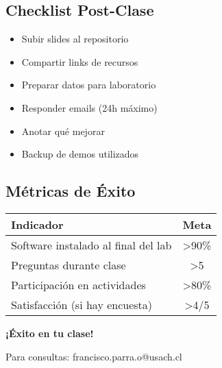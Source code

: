\documentclass[11pt,a4paper]{article}
\begin{document}
\subsection{Checklist Post-Clase}

\begin{itemize}[label=$\square$]
\item Subir slides al repositorio
\item Compartir links de recursos
\item Preparar datos para laboratorio
\item Responder emails (24h máximo)
\item Anotar qué mejorar
\item Backup de demos utilizados
\end{itemize}

\subsection{Métricas de Éxito}

\begin{center}
\begin{tabular}{|l|c|}
\hline
\textbf{Indicador} & \textbf{Meta} \\
\hline
Software instalado al final del lab & >90\% \\
Preguntas durante clase & >5 \\
Participación en actividades & >80\% \\
Satisfacción (si hay encuesta) & >4/5 \\
\hline
\end{tabular}
\end{center}

\vspace{2cm}

\begin{center}
\Large{\textbf{¡Éxito en tu clase!}}

\normalsize
Para consultas: francisco.parra.o@usach.cl
\end{center}
\end{document}
